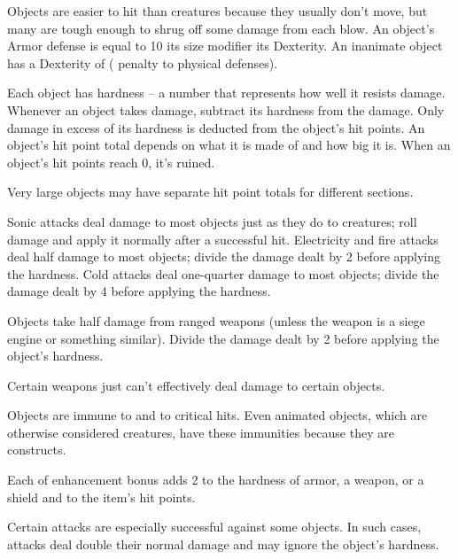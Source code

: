  Objects are easier to hit than creatures because they usually don't move, but many are tough enough to shrug off some damage from each blow. An object's Armor defense is equal to 10 \add its size modifier \add its Dexterity. An inanimate object has a Dexterity of  ( penalty to physical defenses).

 Each object has hardness -- a number that represents how well it resists damage. Whenever an object takes damage, subtract its hardness from the damage. Only damage in excess of its hardness is deducted from the object's hit points.
 An object's hit point total depends on what it is made of and how big it is. When an object's hit points reach 0, it's ruined.

Very large objects may have separate hit point totals for different sections.

 Sonic attacks deal damage to most objects just as they do to creatures; roll damage and apply it normally after a successful hit. Electricity and fire attacks deal half damage to most objects; divide the damage dealt by 2 before applying the hardness. Cold attacks deal one-quarter damage to most objects; divide the damage dealt by 4 before applying the hardness.

 Objects take half damage from ranged weapons (unless the weapon is a siege engine or something similar). Divide the damage dealt by 2 before applying the object's hardness.

 Certain weapons just can't effectively deal damage to certain objects.

 Objects are immune to  and to critical hits. Even animated objects, which are otherwise considered creatures, have these immunities because they are constructs.

 Each  of enhancement bonus adds 2 to the hardness of armor, a weapon, or a shield and  to the item's hit points.

 Certain attacks are especially successful against some objects. In such cases, attacks deal double their normal damage and may ignore the object's hardness.

